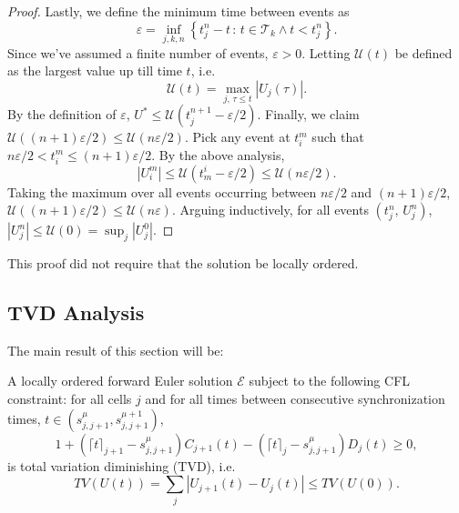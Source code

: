 \begin{proof}
Lastly, we define the minimum time between events as
\begin{equation*}
\varepsilon = \inf_{j,k,n} \left\{ t_j^{n} - t \, : \, t \in \mathcal{T}_k \land t < t_j^n \right\}.
\end{equation*}
Since we've assumed a finite number of events, $\varepsilon>0$. Letting $\mathcal{U}(t)$ be defined as the largest value up till time $t$, i.e.
\begin{equation*}
\mathcal{U}(t) = \max_{j,\,\tau \le t} |U_j(\tau)|.
\end{equation*}
By the definition of $\varepsilon$, $U^* \le \mathcal{U}(t^{n+1}_j - \varepsilon/2)$.
Finally, we claim $\mathcal{U}((n+1)\varepsilon/2) \le \mathcal{U}(n\varepsilon/2)$. Pick any event at $t_i^m$ such that $n\varepsilon/2 < t_i^m \le (n+1) \varepsilon/2$. By the above analysis, 
\begin{equation*}
|U_i^m| \le \mathcal{U}(t_m^i - \varepsilon/2) \le \mathcal{U}(n\varepsilon/2).
\end{equation*}
Taking the maximum over all events occurring between $n\varepsilon/2$ and $(n+1)\varepsilon/2$, $\mathcal{U}((n+1) \varepsilon/2) \le \mathcal{U}(n \varepsilon)$. Arguing inductively, for all events $(t_j^n,\,U_j^n)$, $|U_j^n| \le \mathcal{U}(0) = \sup_j |U_j^0|$.
\end{proof}

\begin{remark}
This proof did not require that the solution be locally ordered.
\end{remark}

\subsection{TVD Analysis}
The main result of this section will be:
\begin{theorem}
\label{thm:tvd-stab}
A locally ordered forward Euler solution $\mathcal{E}$ subject to the following CFL constraint: for all cells $j$ and for all times between consecutive synchronization times, $t \in (s_{j,j+1}^{\mu}, s_{j,j+1}^{\mu+1})$,
\begin{equation}
1 + (\lceil t \rceil_{j+1} - s_{j,j+1}^{\mu})C_{j+1}(t) - (\lceil t \rceil_j - s_{j,j+1}^{\mu})D_{j}(t) \ge 0,
\label{eq:cfl-tvd}
\end{equation}
 is total variation diminishing (TVD), i.e.
\begin{equation*}
TV( U(t) ) = \sum_j |U_{j+1}(t) - U_j(t)| \le TV(U(0)).
\end{equation*}
\end{theorem}

